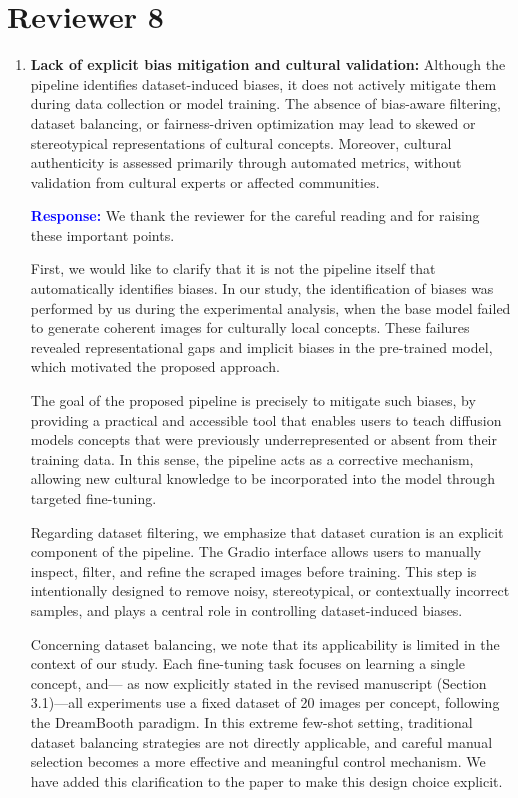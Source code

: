 \documentclass[11pt]{article}
\begin{document}
\section*{Reviewer 8}

\begin{enumerate}[label=\textbf{C\arabic*.}, leftmargin=*]
\item \textbf{Lack of explicit bias mitigation and cultural validation:} Although the pipeline identifies dataset-induced biases, it does not actively mitigate them during data collection or model training. The absence of bias-aware filtering, dataset balancing, or fairness-driven optimization may lead to skewed or stereotypical representations of cultural concepts. Moreover, cultural authenticity is assessed primarily through automated metrics, without validation from cultural experts or affected communities.

\textbf{\textcolor{blue}{Response:}} We thank the reviewer for the careful reading and for raising these important points.

First, we would like to clarify that it is not the pipeline itself that automatically identifies biases. In our study, the identification of biases was performed by us during the experimental analysis, when the base model failed to generate coherent images for culturally local concepts. These failures revealed representational gaps and implicit biases in the pre-trained model, which motivated the proposed approach.


The goal of the proposed pipeline is precisely to mitigate such biases, by providing a practical and accessible tool that enables users to teach diffusion models concepts that were previously underrepresented or absent from their training data. In this sense, the pipeline acts as a corrective mechanism, allowing new cultural knowledge to be incorporated into the model through targeted fine-tuning.

Regarding dataset filtering, we emphasize that dataset curation is an explicit component of the pipeline. The Gradio interface allows users to manually inspect, filter, and refine the scraped images before training. This step is intentionally designed to remove noisy, stereotypical, or contextually incorrect samples, and plays a central role in controlling dataset-induced biases.

Concerning dataset balancing, we note that its applicability is limited in the context of our study. Each fine-tuning task focuses on learning a single concept, and— as now explicitly stated in the revised manuscript (Section 3.1)—all experiments use a fixed dataset of 20 images per concept, following the DreamBooth paradigm. In this extreme few-shot setting, traditional dataset balancing strategies are not directly applicable, and careful manual selection becomes a more effective and meaningful control mechanism. We have added this clarification to the paper to make this design choice explicit.


\end{enumerate}
\end{document}
